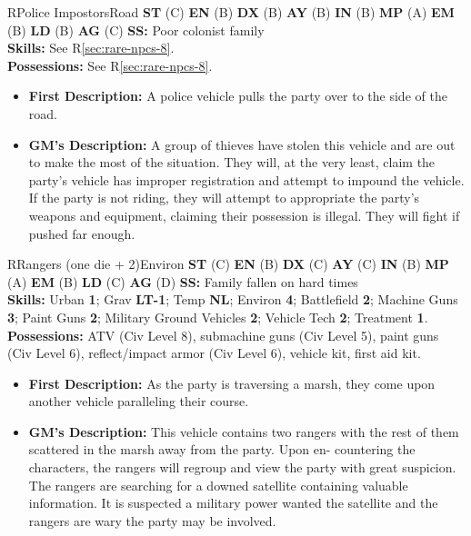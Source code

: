 \begin{npc}{R}{Police Impostors}{Road}
\textbf{ST} (C) \textbf{EN} (B) \textbf{DX} (B) \textbf{AY} (B) \textbf{IN} (B) \textbf{MP} (A) \textbf{EM} (B) \textbf{LD} (B) \textbf{AG} (C) 
\textbf{SS:} Poor colonist family \\
\textbf{Skills:} See R\ref{sec:rare-npcs-8}. \\
\textbf{Possessions:} See R\ref{sec:rare-npcs-8}. 
\begin{itemize}
\item \textbf{First Description:} A police vehicle pulls the party over to the side of the road. 
\item \textbf{GM's Description:} A group of thieves have stolen this vehicle and are out to make the most of the situation. They will, at the very 
least, claim the party's vehicle has improper registration and attempt to impound the vehicle. If the party is not riding, they will attempt 
to appropriate the party's weapons and equipment, claiming their possession is illegal. They will fight if pushed far enough. 
\end{itemize}
\end{npc}

\hrulefill

\begin{npc}{R}{Rangers (one die + 2)}{Environ}
\textbf{ST} (C) \textbf{EN} (B) \textbf{DX} (C) \textbf{AY} (C) \textbf{IN} (B) \textbf{MP} (A) \textbf{EM} (B) \textbf{LD} (C) \textbf{AG} (D) \textbf{SS:} Family fallen on hard times \\
\textbf{Skills:} Urban \textbf{1}; Grav \textbf{LT-1}; Temp \textbf{NL}; Environ \textbf{4}; Battlefield \textbf{2}; Machine Guns \textbf{3}; Paint Guns \textbf{2}; Military Ground Vehicles \textbf{2}; Vehicle 
Tech \textbf{2}; Treatment \textbf{1}. \\
\textbf{Possessions:} ATV (Civ Level 8), submachine guns (Civ Level 5), paint guns (Civ Level 6), reflect/impact armor (Civ Level 6), vehicle 
kit, first aid kit. 
\begin{itemize}
\item \textbf{First Description:} As the party is traversing a marsh, they come upon another vehicle paralleling their course. 
\item \textbf{GM's Description:} This vehicle contains two rangers with the rest of them scattered in the marsh away from the party. Upon en- 
countering the characters, the rangers will regroup and view the party with great suspicion. The rangers are searching for a downed 
satellite containing valuable information. It is suspected a military power wanted the satellite and the rangers are wary the party may be 
involved. 
\end{itemize}
\end{npc}

